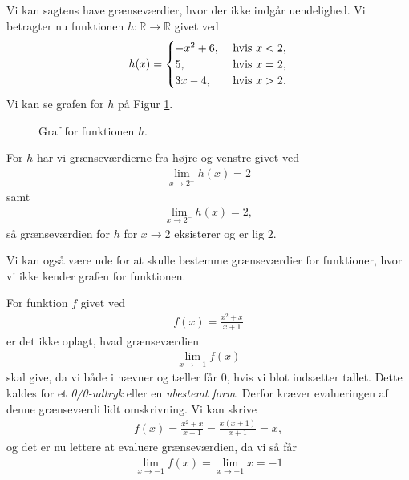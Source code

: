 \begin{exa}
	Vi kan sagtens have grænseværdier, hvor der ikke indgår uendelighed. Vi betragter nu funktionen 
	$h:\mathbb{R} \to \mathbb{R}$ givet ved
	\begin{align*}
		h(x) = 
		\begin{cases}
		-x^2 + 6, \ &\textnormal{hvis } x < 2, \\
		5, &\textnormal{hvis } x = 2, \\
		3x - 4, &\textnormal{hvis } x > 2. 
		\end{cases}
	\end{align*}
	Vi kan se grafen for $h$ på Figur \ref{fig:grænse3}.
	\begin{figure}[H]
	\centering
	\caption{Graf for funktionen $h$.}
	\label{fig:grænse3}
	\end{figure}
	For $h$ har vi grænseværdierne fra højre og venstre givet ved 
	\begin{align*}
		\lim_{x \to 2^+} h(x) = 2
	\end{align*}
	samt 
	\begin{align*}
		\lim_{x \to 2^-}h(x) = 2,
	\end{align*}
	så grænseværdien for $h$ for $x \to 2$ eksisterer og er lig $2$.
\end{exa}
Vi kan også være ude for at skulle bestemme grænseværdier for funktioner, hvor vi ikke kender grafen for funktionen. 
\begin{exa}
	For funktion $f$ givet ved
	\begin{align*}
		f(x) = \frac{x^2 + x}{x + 1}
	\end{align*}
	er det ikke oplagt, hvad grænseværdien
	\begin{align*}
		\lim_{x \to -1}f(x)
	\end{align*}
	skal give, da vi både i nævner og tæller får $0$, hvis vi blot indsætter tallet. 
	Dette kaldes for et \textit{0/0-udtryk} eller en \textit{ubestemt form}. Derfor kræver evalueringen
	af denne grænseværdi lidt omskrivning. Vi kan skrive
	\begin{align*}
		f(x) = \frac{x^2 + x}{x + 1} = \frac{x(x+1)}{x+1} = x,
	\end{align*}
	og det er nu lettere at evaluere grænseværdien, da vi så får
	\begin{align*}
		\lim_{x \to -1}f(x) =\lim_{x \to -1}x = -1
	\end{align*}
\end{exa}

